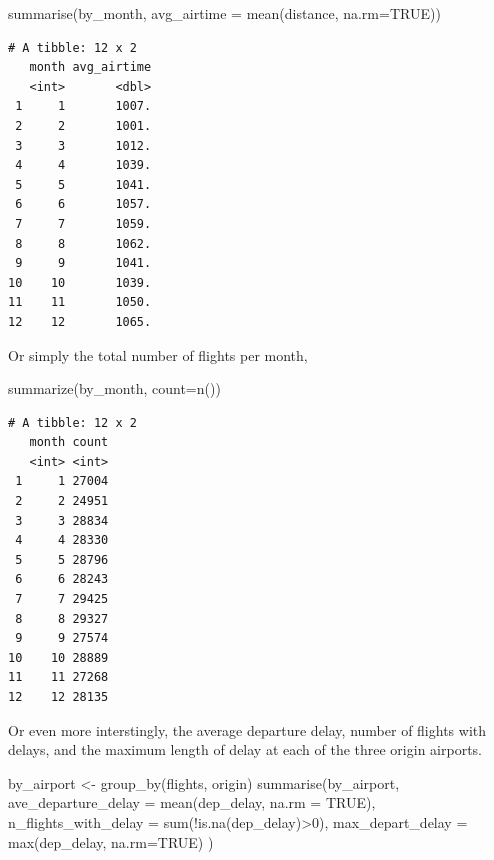 \documentclass[
  letterpaper,
  DIV=11,
  numbers=noendperiod,
  oneside]{scrreprt}
\newenvironment{Shaded}{\begin{snugshade}}{\end{snugshade}}
\newcommand{\AttributeTok}[1]{\textcolor[rgb]{0.40,0.45,0.13}{#1}}
\newcommand{\ConstantTok}[1]{\textcolor[rgb]{0.56,0.35,0.01}{#1}}
\newcommand{\DecValTok}[1]{\textcolor[rgb]{0.68,0.00,0.00}{#1}}
\newcommand{\FunctionTok}[1]{\textcolor[rgb]{0.28,0.35,0.67}{#1}}
\newcommand{\NormalTok}[1]{\textcolor[rgb]{0.00,0.23,0.31}{#1}}
\newcommand{\OtherTok}[1]{\textcolor[rgb]{0.00,0.23,0.31}{#1}}
\newcommand{\SpecialCharTok}[1]{\textcolor[rgb]{0.37,0.37,0.37}{#1}}
\begin{document}
\begin{Shaded}
\begin{Highlighting}[]
\FunctionTok{summarise}\NormalTok{(by\_month, }\AttributeTok{avg\_airtime =} \FunctionTok{mean}\NormalTok{(distance, }\AttributeTok{na.rm=}\ConstantTok{TRUE}\NormalTok{))}
\end{Highlighting}
\end{Shaded}

\begin{verbatim}
# A tibble: 12 x 2
   month avg_airtime
   <int>       <dbl>
 1     1       1007.
 2     2       1001.
 3     3       1012.
 4     4       1039.
 5     5       1041.
 6     6       1057.
 7     7       1059.
 8     8       1062.
 9     9       1041.
10    10       1039.
11    11       1050.
12    12       1065.
\end{verbatim}

Or simply the total number of flights per month,

\begin{Shaded}
\begin{Highlighting}[]
\FunctionTok{summarize}\NormalTok{(by\_month, }\AttributeTok{count=}\FunctionTok{n}\NormalTok{())}
\end{Highlighting}
\end{Shaded}

\begin{verbatim}
# A tibble: 12 x 2
   month count
   <int> <int>
 1     1 27004
 2     2 24951
 3     3 28834
 4     4 28330
 5     5 28796
 6     6 28243
 7     7 29425
 8     8 29327
 9     9 27574
10    10 28889
11    11 27268
12    12 28135
\end{verbatim}

Or even more interstingly, the average departure delay, number of
flights with delays, and the maximum length of delay at each of the
three origin airports.

\begin{Shaded}
\begin{Highlighting}[]
\NormalTok{by\_airport }\OtherTok{\textless{}{-}} \FunctionTok{group\_by}\NormalTok{(flights, origin)}
\FunctionTok{summarise}\NormalTok{(by\_airport, }
          \AttributeTok{ave\_departure\_delay =} \FunctionTok{mean}\NormalTok{(dep\_delay, }\AttributeTok{na.rm =} \ConstantTok{TRUE}\NormalTok{), }
          \AttributeTok{n\_flights\_with\_delay =} \FunctionTok{sum}\NormalTok{(}\SpecialCharTok{!}\FunctionTok{is.na}\NormalTok{(dep\_delay)}\SpecialCharTok{\textgreater{}}\DecValTok{0}\NormalTok{), }
          \AttributeTok{max\_depart\_delay =} \FunctionTok{max}\NormalTok{(dep\_delay, }\AttributeTok{na.rm=}\ConstantTok{TRUE}\NormalTok{)}
\NormalTok{)}
\end{Highlighting}
\end{Shaded}
\end{document}
